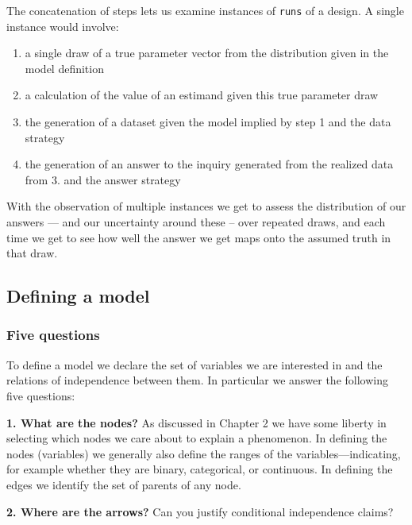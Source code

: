 \documentclass[12pt,]{book}
\providecommand{\tightlist}{%
  \setlength{\itemsep}{0pt}\setlength{\parskip}{0pt}}
\begin{document}
The concatenation of steps lets us examine instances of \texttt{runs} of a design. A single instance would involve:

\begin{enumerate}
\def\labelenumi{\arabic{enumi}.}
\tightlist
\item
  a single draw of a true parameter vector from the distribution given in the model definition
\item
  a calculation of the value of an estimand given this true parameter draw
\item
  the generation of a dataset given the model implied by step 1 and the data strategy
\item
  the generation of an answer to the inquiry generated from the realized data from 3. and the answer strategy
\end{enumerate}

With the observation of multiple instances we get to assess the distribution of our answers --- and our uncertainty around these -- over repeated draws, and each time we get to see how well the answer we get maps onto the assumed truth in that draw.

\hypertarget{defining-a-model}{%
\subsection{Defining a model}\label{defining-a-model}}

\hypertarget{five-questions}{%
\subsubsection{Five questions}\label{five-questions}}

To define a model we declare the set of variables we are interested in and the relations of independence between them. In particular we answer the following five questions:

\textbf{1. What are the nodes?} As discussed in Chapter 2 we have some liberty in selecting which nodes we care about to explain a phenomenon. In defining the nodes (variables) we generally also define the ranges of the variables---indicating, for example whether they are binary, categorical, or continuous. In defining the edges we identify the set of parents of any node.

\textbf{2. Where are the arrows?} Can you justify conditional independence claims?
\end{document}
